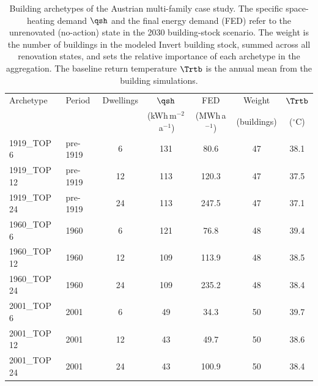 \begin{table}[htbp]
\centering
\caption{Building archetypes of the Austrian multi-family case study. The specific space-heating demand $\qsh$ and the final energy demand (FED) refer to the unrenovated (no-action) state in the 2030 building-stock scenario. The weight is the number of buildings in the modeled Invert building stock, summed across all renovation states, and sets the relative importance of each archetype in the aggregation. The baseline return temperature $\Trtb$ is the annual mean from the building simulations.}
\label{tab:archetypes}
\footnotesize
\setlength{\tabcolsep}{3.5pt}
\begin{tabular}{llccccc}
\toprule
Archetype & Period & Dwellings & $\qsh$ & FED & Weight & $\Trtb$ \\
 & & & (kWh\,m$^{-2}$\,a$^{-1}$) & (MWh\,a$^{-1}$) & (buildings) & ($^{\circ}$C) \\
\midrule
1919\_TOP 6 & pre-1919 & 6 & 131 & 80.6 & 47 & 38.1 \\
1919\_TOP 12 & pre-1919 & 12 & 113 & 120.3 & 47 & 37.5 \\
1919\_TOP 24 & pre-1919 & 24 & 113 & 247.5 & 47 & 37.1 \\
1960\_TOP 6 & 1960 & 6 & 121 & 76.8 & 48 & 39.4 \\
1960\_TOP 12 & 1960 & 12 & 109 & 113.9 & 48 & 38.5 \\
1960\_TOP 24 & 1960 & 24 & 109 & 235.2 & 48 & 38.4 \\
2001\_TOP 6 & 2001 & 6 & 49 & 34.3 & 50 & 39.7 \\
2001\_TOP 12 & 2001 & 12 & 43 & 49.7 & 50 & 38.6 \\
2001\_TOP 24 & 2001 & 24 & 43 & 100.9 & 50 & 38.4 \\
\bottomrule
\end{tabular}
\end{table}
